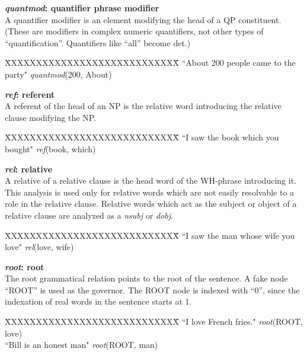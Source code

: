 \documentclass[11pt,letter]{article}
\begin{document}
\noindent\textbf{\emph{quantmod}: quantifier phrase modifier}\\
A quantifier modifier is an element modifying the head of a QP constituent.  (These are modifiers in complex numeric quantifiers, not other types of ``quantification''.  Quantifiers like ``all'' become det.)
\begin{tabbing}
	\hspace{1cm} \=XXXXXXXXXXXXXXXXXXXXXXXXXXXX\= \hspace{1cm}\=  \kill
\>  ``About 200 people came to the party" \> \> \emph{quantmod}(200, About)\\
\end{tabbing}

\noindent\textbf{\emph{ref}: referent}\\
A referent of the head of an NP is the relative word introducing the relative clause modifying the NP.
\begin{tabbing}
\hspace{1cm} \=XXXXXXXXXXXXXXXXXXXXXXXXXXXX\= \hspace{1cm}\=  \kill
\>  ``I saw the book which you bought" \> \> \emph{ref}(book, which)\\
\end{tabbing}

\noindent\textbf{\emph{rel}: relative}\\
A relative of a relative clause is the head word of the WH-phrase introducing it.
This analysis is used only for relative words which are not easily
resolvable to a role in the relative clause. Relative words which act
as the subject or object of a relative clause are analyzed as a
\emph{nsubj} or \emph{dobj}.
\begin{tabbing}
\hspace{1cm} \=XXXXXXXXXXXXXXXXXXXXXXXXXXXX\= \hspace{1cm}\=  \kill
\> ``I saw the man whose wife you love" \> \> \emph{rel}(love, wife)
\end{tabbing}

\noindent\textbf{\emph{root}: root}\\
The root grammatical relation points to the root of the sentence. A fake node ``ROOT'' is used as the governor. The ROOT node is indexed with ``0'', since the indexation of real words in the sentence starts at 1.
\begin{tabbing}
\hspace{1cm} \=XXXXXXXXXXXXXXXXXXXXXXXXXXXX\= \hspace{1cm}\=  \kill
\> ``I love French fries." \> \> \emph{root}(ROOT, love)\\
\> ``Bill is an honest man" \>  \> \emph{root}(ROOT, man)\\
\end{tabbing}
\end{document}
